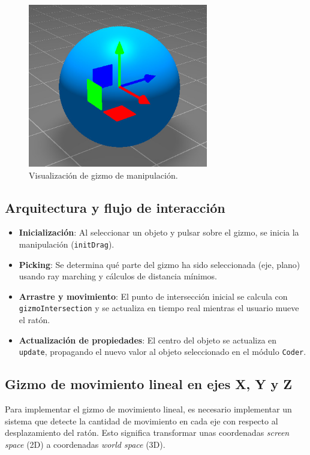 \begin{figure}[H]
	\centering
	\includegraphics[width=0.7\textwidth]{imagenes/gizmo.jpg}
	\caption{Visualización de gizmo de manipulación.}
\end{figure}

\subsection{Arquitectura y flujo de interacción}

\begin{itemize}
    \item \textbf{Inicialización}: Al seleccionar un objeto y pulsar sobre el gizmo, se inicia la manipulación (\texttt{initDrag}).
    \item \textbf{Picking}: Se determina qué parte del gizmo ha sido seleccionada (eje, plano) usando ray marching y cálculos de distancia mínimos.
    \item \textbf{Arrastre y movimiento}: El punto de intersección inicial se calcula con \texttt{gizmoIntersection} y se actualiza en tiempo real mientras el usuario mueve el ratón.
    \item \textbf{Actualización de propiedades}: El centro del objeto se actualiza en \texttt{update}, propagando el nuevo valor al objeto seleccionado en el módulo \texttt{Coder}.
\end{itemize}


\subsection{Gizmo de movimiento lineal en ejes X, Y y Z}

Para implementar el gizmo de movimiento lineal, es necesario implementar un
sistema que detecte la cantidad de movimiento en cada eje con respecto al
desplazamiento del ratón. Esto significa transformar unas coordenadas
\textit{screen space} (2D) a coordenadas \textit{world space} (3D).

